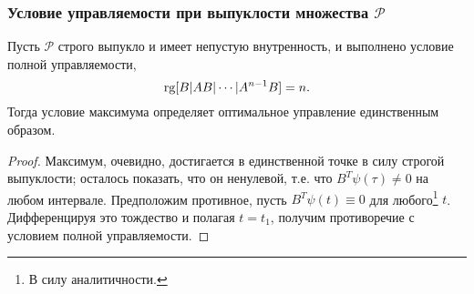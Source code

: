 \subsubsection{Условие управляемости при выпуклости множества $\mathcal{P}$}
\begin{theorem}
  Пусть $\mathcal{P}$ строго выпукло и имеет непустую внутренность,
  и выполнено условие полной управляемости,
  $$
    \operatorname{rg}[B |AB| \cdots |A^{n - 1}B] = n.
  $$
  Тогда условие максимума определяет
  оптимальное управление единственным образом.
\end{theorem}
\begin{proof}
  Максимум, очевидно, достигается в единственной точке
  в силу строгой выпуклости; осталось показать,
  что он ненулевой, т.е. что $B^T\psi(\tau) \neq 0$ на любом интервале.
  Предположим противное,
  пусть $B^T\psi(t) \equiv 0$ для
  любого\footnote{В силу аналитичности.} $t$.
  Дифференцируя это тождество и полагая $t = t_1$,
  получим противоречие с условием полной управляемости.
\end{proof}
